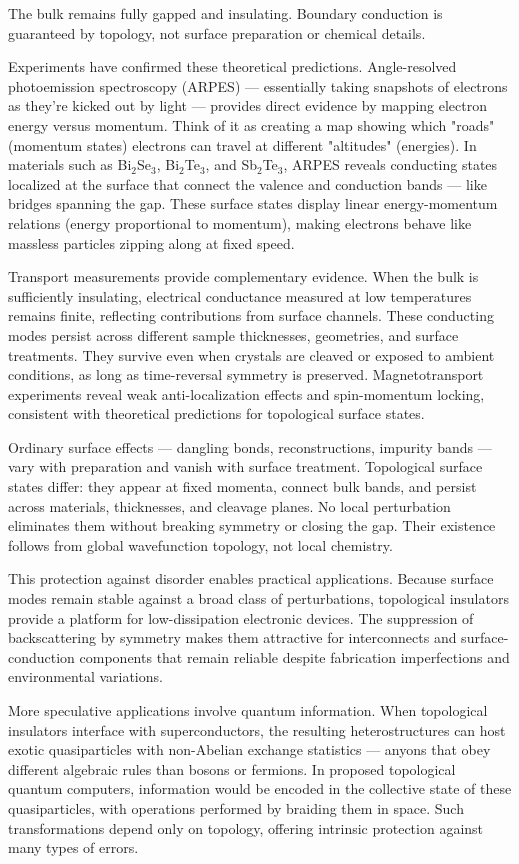 The bulk remains fully gapped and insulating. Boundary conduction is guaranteed by topology, not surface preparation or chemical details.

Experiments have confirmed these theoretical predictions. Angle-resolved photoemission spectroscopy (ARPES) — essentially taking snapshots of electrons as they're kicked out by light — provides direct evidence by mapping electron energy versus momentum. Think of it as creating a map showing which "roads" (momentum states) electrons can travel at different "altitudes" (energies). In materials such as Bi\(_2\)Se\(_3\), Bi\(_2\)Te\(_3\), and Sb\(_2\)Te\(_3\), ARPES reveals conducting states localized at the surface that connect the valence and conduction bands — like bridges spanning the gap. These surface states display linear energy-momentum relations (energy proportional to momentum), making electrons behave like massless particles zipping along at fixed speed.

Transport measurements provide complementary evidence. When the bulk is sufficiently insulating, electrical conductance measured at low temperatures remains finite, reflecting contributions from surface channels. These conducting modes persist across different sample thicknesses, geometries, and surface treatments. They survive even when crystals are cleaved or exposed to ambient conditions, as long as time-reversal symmetry is preserved. Magnetotransport experiments reveal weak anti-localization effects and spin-momentum locking, consistent with theoretical predictions for topological surface states.

Ordinary surface effects — dangling bonds, reconstructions, impurity bands — vary with preparation and vanish with surface treatment. Topological surface states differ: they appear at fixed momenta, connect bulk bands, and persist across materials, thicknesses, and cleavage planes. No local perturbation eliminates them without breaking symmetry or closing the gap. Their existence follows from global wavefunction topology, not local chemistry.

This protection against disorder enables practical applications. Because surface modes remain stable against a broad class of perturbations, topological insulators provide a platform for low-dissipation electronic devices. The suppression of backscattering by symmetry makes them attractive for interconnects and surface-conduction components that remain reliable despite fabrication imperfections and environmental variations.

More speculative applications involve quantum information. When topological insulators interface with superconductors, the resulting heterostructures can host exotic quasiparticles with non-Abelian exchange statistics — anyons that obey different algebraic rules than bosons or fermions. In proposed topological quantum computers, information would be encoded in the collective state of these quasiparticles, with operations performed by braiding them in space. Such transformations depend only on topology, offering intrinsic protection against many types of errors.

